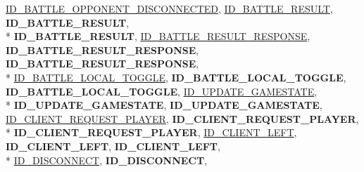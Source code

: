 \begin{DoxyCompactItemize}
\hyperlink{namespace_champ_net_plugin_a2ade5cfa7cf6c25ab7236c6b54a57821addd7d4ef5710787934d893be10785f0d}{I\-D\-\_\-\-B\-A\-T\-T\-L\-E\-\_\-\-O\-P\-P\-O\-N\-E\-N\-T\-\_\-\-D\-I\-S\-C\-O\-N\-N\-E\-C\-T\-E\-D}, 
\hyperlink{namespace_champ_net_plugin_a2ade5cfa7cf6c25ab7236c6b54a57821a744cf8458d36d27da738fcf6ba76001c}{I\-D\-\_\-\-B\-A\-T\-T\-L\-E\-\_\-\-R\-E\-S\-U\-L\-T}, 
{\bfseries I\-D\-\_\-\-B\-A\-T\-T\-L\-E\-\_\-\-R\-E\-S\-U\-L\-T}, 
\\*
{\bfseries I\-D\-\_\-\-B\-A\-T\-T\-L\-E\-\_\-\-R\-E\-S\-U\-L\-T}, 
\hyperlink{namespace_champ_net_plugin_a2ade5cfa7cf6c25ab7236c6b54a57821a0400430dae2bfdb56c3c5be84d5fc2b1}{I\-D\-\_\-\-B\-A\-T\-T\-L\-E\-\_\-\-R\-E\-S\-U\-L\-T\-\_\-\-R\-E\-S\-P\-O\-N\-S\-E}, 
{\bfseries I\-D\-\_\-\-B\-A\-T\-T\-L\-E\-\_\-\-R\-E\-S\-U\-L\-T\-\_\-\-R\-E\-S\-P\-O\-N\-S\-E}, 
{\bfseries I\-D\-\_\-\-B\-A\-T\-T\-L\-E\-\_\-\-R\-E\-S\-U\-L\-T\-\_\-\-R\-E\-S\-P\-O\-N\-S\-E}, 
\\*
\hyperlink{namespace_champ_net_plugin_a2ade5cfa7cf6c25ab7236c6b54a57821a01d87e1852357f746b5c583c76db4e23}{I\-D\-\_\-\-B\-A\-T\-T\-L\-E\-\_\-\-L\-O\-C\-A\-L\-\_\-\-T\-O\-G\-G\-L\-E}, 
{\bfseries I\-D\-\_\-\-B\-A\-T\-T\-L\-E\-\_\-\-L\-O\-C\-A\-L\-\_\-\-T\-O\-G\-G\-L\-E}, 
{\bfseries I\-D\-\_\-\-B\-A\-T\-T\-L\-E\-\_\-\-L\-O\-C\-A\-L\-\_\-\-T\-O\-G\-G\-L\-E}, 
\hyperlink{namespace_champ_net_plugin_a2ade5cfa7cf6c25ab7236c6b54a57821a6c390584862af2434c946e375365fe02}{I\-D\-\_\-\-U\-P\-D\-A\-T\-E\-\_\-\-G\-A\-M\-E\-S\-T\-A\-T\-E}, 
\\*
{\bfseries I\-D\-\_\-\-U\-P\-D\-A\-T\-E\-\_\-\-G\-A\-M\-E\-S\-T\-A\-T\-E}, 
{\bfseries I\-D\-\_\-\-U\-P\-D\-A\-T\-E\-\_\-\-G\-A\-M\-E\-S\-T\-A\-T\-E}, 
\hyperlink{namespace_champ_net_plugin_a2ade5cfa7cf6c25ab7236c6b54a57821a95ea635e1f4775e77d635b7039a9711e}{I\-D\-\_\-\-C\-L\-I\-E\-N\-T\-\_\-\-R\-E\-Q\-U\-E\-S\-T\-\_\-\-P\-L\-A\-Y\-E\-R}, 
{\bfseries I\-D\-\_\-\-C\-L\-I\-E\-N\-T\-\_\-\-R\-E\-Q\-U\-E\-S\-T\-\_\-\-P\-L\-A\-Y\-E\-R}, 
\\*
{\bfseries I\-D\-\_\-\-C\-L\-I\-E\-N\-T\-\_\-\-R\-E\-Q\-U\-E\-S\-T\-\_\-\-P\-L\-A\-Y\-E\-R}, 
\hyperlink{namespace_champ_net_plugin_a2ade5cfa7cf6c25ab7236c6b54a57821a170a6a655b34086567c4039a8e9ba81d}{I\-D\-\_\-\-C\-L\-I\-E\-N\-T\-\_\-\-L\-E\-F\-T}, 
{\bfseries I\-D\-\_\-\-C\-L\-I\-E\-N\-T\-\_\-\-L\-E\-F\-T}, 
{\bfseries I\-D\-\_\-\-C\-L\-I\-E\-N\-T\-\_\-\-L\-E\-F\-T}, 
\\*
\hyperlink{namespace_champ_net_plugin_a2ade5cfa7cf6c25ab7236c6b54a57821ab64ca706dd3c8029ea9dc9a239237e15}{I\-D\-\_\-\-D\-I\-S\-C\-O\-N\-N\-E\-C\-T}, 
{\bfseries I\-D\-\_\-\-D\-I\-S\-C\-O\-N\-N\-E\-C\-T}, 

\end{DoxyCompactItemize}
